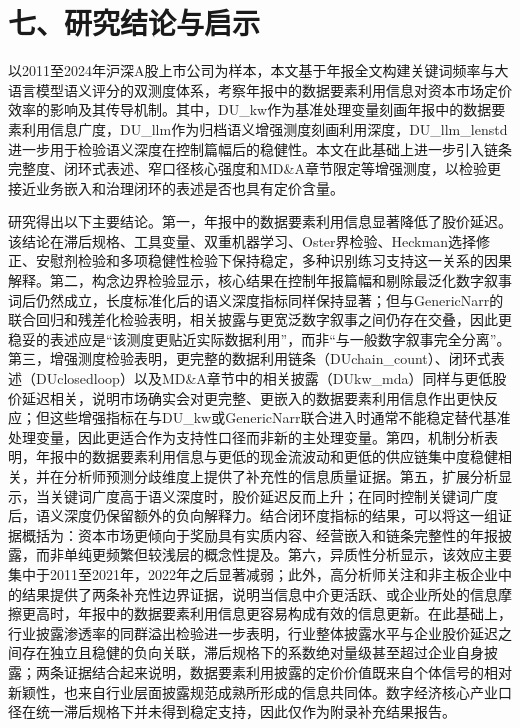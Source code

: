\section{七、研究结论与启示}\label{ux4e03ux7814ux7a76ux7ed3ux8bbaux4e0eux542fux793a}

以2011至2024年沪深A股上市公司为样本，本文基于年报全文构建关键词频率与大语言模型语义评分的双测度体系，考察年报中的数据要素利用信息对资本市场定价效率的影响及其传导机制。其中，DU\_kw作为基准处理变量刻画年报中的数据要素利用信息广度，DU\_llm作为归档语义增强测度刻画利用深度，DU\_llm\_lenstd进一步用于检验语义深度在控制篇幅后的稳健性。本文在此基础上进一步引入链条完整度、闭环式表述、窄口径核心强度和MD\&A章节限定等增强测度，以检验更接近业务嵌入和治理闭环的表述是否也具有定价含量。

研究得出以下主要结论。第一，年报中的数据要素利用信息显著降低了股价延迟。该结论在滞后规格、工具变量、双重机器学习、Oster界检验、Heckman选择修正、安慰剂检验和多项稳健性检验下保持稳定，多种识别练习支持这一关系的因果解释。第二，构念边界检验显示，核心结果在控制年报篇幅和剔除最泛化数字叙事词后仍然成立，长度标准化后的语义深度指标同样保持显著；但与GenericNarr的联合回归和残差化检验表明，相关披露与更宽泛数字叙事之间仍存在交叠，因此更稳妥的表述应是``该测度更贴近实际数据利用''，而非``与一般数字叙事完全分离''。第三，增强测度检验表明，更完整的数据利用链条（DUchain\_count）、闭环式表述（DUclosedloop）以及MD\&A章节中的相关披露（DUkw\_mda）同样与更低股价延迟相关，说明市场确实会对更完整、更嵌入的数据要素利用信息作出更快反应；但这些增强指标在与DU\_kw或GenericNarr联合进入时通常不能稳定替代基准处理变量，因此更适合作为支持性口径而非新的主处理变量。第四，机制分析表明，年报中的数据要素利用信息与更低的现金流波动和更低的供应链集中度稳健相关，并在分析师预测分歧维度上提供了补充性的信息质量证据。第五，扩展分析显示，当关键词广度高于语义深度时，股价延迟反而上升；在同时控制关键词广度后，语义深度仍保留额外的负向解释力。结合闭环度指标的结果，可以将这一组证据概括为：资本市场更倾向于奖励具有实质内容、经营嵌入和链条完整性的年报披露，而非单纯更频繁但较浅层的概念性提及。第六，异质性分析显示，该效应主要集中于2011至2021年，2022年之后显著减弱；此外，高分析师关注和非主板企业中的结果提供了两条补充性边界证据，说明当信息中介更活跃、或企业所处的信息摩擦更高时，年报中的数据要素利用信息更容易构成有效的信息更新。在此基础上，行业披露渗透率的同群溢出检验进一步表明，行业整体披露水平与企业股价延迟之间存在独立且稳健的负向关联，滞后规格下的系数绝对量级甚至超过企业自身披露；两条证据结合起来说明，数据要素利用披露的定价价值既来自个体信号的相对新颖性，也来自行业层面披露规范成熟所形成的信息共同体。数字经济核心产业口径在统一滞后规格下并未得到稳定支持，因此仅作为附录补充结果报告。

